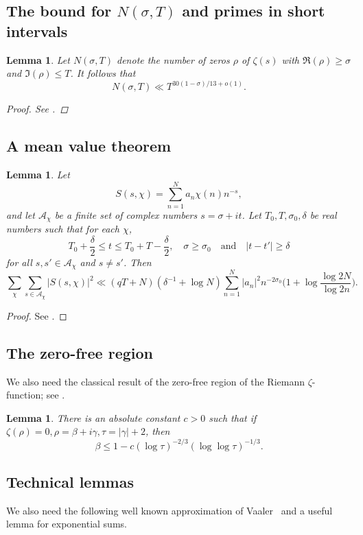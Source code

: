 \documentclass[12pt, reqno, twoside, letterpaper]{amsart}
\numberwithin{equation}{section}
\theoremstyle{customthm}
\newtheorem{lemma}[X]{Lemma}
\theoremstyle{customrem}
\begin{document}
\subsection{The bound for $N(\sigma,T)$ and primes in short intervals}
\begin{lemma}
\label{lemma:Maynard}
Let $N(\sigma,T)$ denote the number of zeros $\rho $ of $\zeta(s)$ with $\Re(\rho)\geqslant \sigma$ and $\Im(\rho)\leqslant T$. It follows that
$$
N(\sigma,T)\ll T^{30(1-\sigma)/13+o(1)}.
$$
\begin{proof}
See \cite[Theorem~1.2]{Maynard}.
\end{proof}
\end{lemma}


\subsection{A mean value theorem}
\begin{lemma}
\label{lem:mean_value}
Let 
$$
S(s,\chi)=\sum_{n=1}^{N}a_n\chi(n)n^{-s},
$$
and let $\mathcal{A}_\chi$ be a finite set of complex numbers $s=\sigma+it$. Let $T_0,T,\sigma_0,\delta$ be real numbers such that for each $\chi$,
$$
T_0+\frac{\delta}{2}\leqslant t\leqslant T_0+T-\frac{\delta}{2},\quad \sigma\geqslant \sigma_0 \quad \text{and} \quad |t-t'|\geqslant \delta 
$$
for all $s,s'\in\mathcal{A}_\chi$ and $s\neq s'$. Then 
$$
\sum_{\chi}\sum_{s\in \mathcal{A}_\chi}|S(s,\chi)|^2\ll (qT+N)(\delta^{-1}+\log N)\sum_{n=1}^{N}|a_n|^2n^{-2\sigma_0}\bigg( 1+\log \frac{\log 2N}{\log 2n} \bigg).
$$ 
\end{lemma}

\begin{proof}
See \cite[Theorem~7.6]{Montgomery2}.
\end{proof}

\subsection{The zero-free region}

We also need the classical result of the zero-free region of the Riemann $\zeta$-function; see \cite[Corollary~11.4]{Montgomery2}.
\begin{lemma}
\label{zero-free}
There is an absolute constant $c>0$ such that if $\zeta(\rho)=0, \rho=\beta+i\gamma, \tau=|\gamma|+2$, then
$$
\beta \leqslant 1-c(\log \tau)^{-2/3}(\log\log\tau)^{-1/3}.
$$
\end{lemma}


\subsection{Technical lemmas }
We also need the following well known approximation of Vaaler~\cite{Vaal} and a useful lemma for exponential sums.
\end{document}
